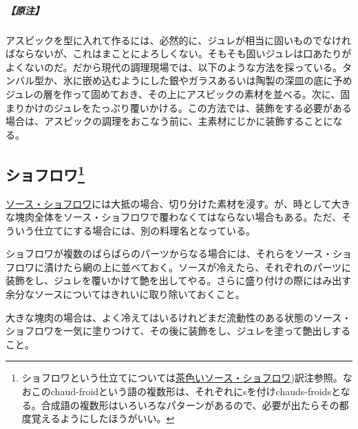 \hypertarget{nota-aspics}{%
\subparagraph{【原注】}\label{nota-aspics}}

アスピックを型に入れて作るには、必然的に、ジュレが相当に固いものでなければならないが、これはまことによろしくない。そもそも固いジュレは口あたりがよくないのだ。だから現代の調理現場では、以下のような方法を採っている。タンバル型か、氷に嵌め込むようにした銀やガラスあるいは陶製の深皿の底に予めジュレの層を作って固めておき、その上にアスピックの素材を並べる。次に、固まりかけのジュレをたっぷり覆いかける。この方法では、装飾をする必要がある場合は、アスピックの調理をおこなう前に、主素材にじかに装飾することになる。

\hypertarget{chauds-froids}{%
\subsection[ショフロワ]{\texorpdfstring{ショフロワ\footnote{ショフロワという仕立てについては\protect\hyperlink{sauce-chaud-froid-brune}{茶色いソース・ショフロワ})訳注参照。なおこのchaud-froidという語の複数形は、それぞれにsを付けchauds-froidsとなる。合成語の複数形はいろいろなパターンがあるので、必要が出たらその都度覚えるようにしたほうがいい。}}{ショフロワ}}\label{chauds-froids}}



\protect\hyperlink{sauce-chaud-froid-ordinaire}{ソース・ショフロワ}には大抵の場合、切り分けた素材を浸す。が、時として大きな塊肉全体をソース・ショフロワで覆わなくてはならない場合もある。ただ、そういう仕立てにする場合には、別の料理名となっている。

ショフロワが複数のばらばらのパーツからなる場合には、それらをソース・ショフロワに漬けたら網の上に並べておく。ソースが冷えたら、それぞれのパーツに装飾をし、ジュレを覆いかけて艶を出してやる。さらに盛り付けの際にはみ出す余分なソースについてはきれいに取り除いておくこと。

大きな塊肉の場合は、よく冷えてはいるけれどまだ流動性のある状態のソース・ショフロワを一気に塗りつけて、その後に装飾をし、ジュレを塗って艶出しすること。

